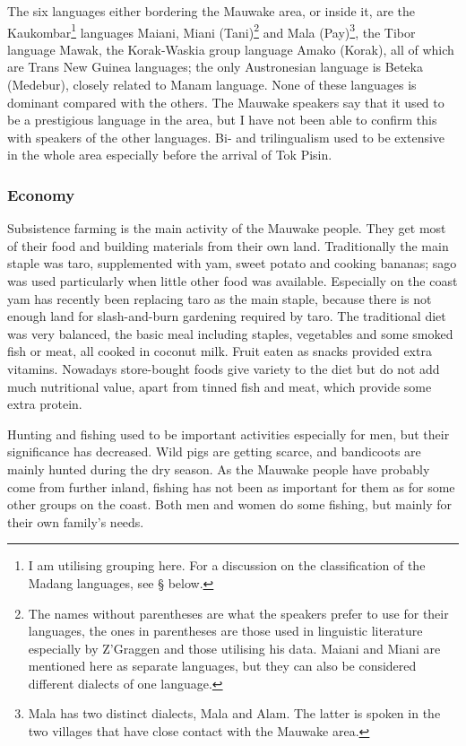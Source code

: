 The six languages either bordering the Mauwake area, or inside it, are the Kaukombar\footnote{I am utilising  grouping here. For a discussion on the classification of the Madang languages, see {\S} below.} languages Maiani, Miani (Tani)\footnote{The names without parentheses are what the speakers prefer to use for their languages, the ones in parentheses are those used in linguistic literature especially by Z'Graggen and those utilising his data. Maiani and Miani are mentioned here as separate languages, but they can also be considered different dialects of one language.}  and Mala (Pay)\footnote{Mala has two distinct dialects, Mala and Alam. The latter is spoken in the two villages that have close contact with the Mauwake area.}, the Tibor language Mawak, the Korak-Waskia group language Amako (Korak), all of which are Trans New Guinea languages; the only Austronesian language is Beteka (Medebur), closely related to Manam language. None of these languages is dominant compared with the others.  The Mauwake speakers say that it used to be a prestigious language in the area, but I have not been able to confirm this with speakers of the other languages. Bi- and trilingualism used to be extensive in the whole area especially before the arrival of Tok Pisin. 


\subsubsection{Economy}
Subsistence farming is the main activity of the Mauwake people. They get most of their food and building materials from their own land.  Traditionally the main staple was taro, supplemented with yam, sweet potato and cooking bananas; sago was used particularly when little other food was available. Especially on the coast yam has recently been replacing taro as the main staple, because there is not enough land for slash-and-burn gardening required by taro. The traditional diet was very balanced, the basic meal including staples, vegetables and some smoked fish or meat, all cooked in coconut milk. Fruit eaten as snacks provided extra vitamins. Nowadays store-bought foods give variety to the diet but do not add much nutritional value, apart from tinned fish and meat, which provide some extra protein.

Hunting and fishing used to be important activities especially for men, but their significance has decreased. Wild pigs are getting scarce, and bandicoots are mainly hunted during the dry season.  As the Mauwake people have probably come from further inland, fishing has not been as important for them as for some other groups on the coast.  Both men and women do some fishing, but mainly for their own family's needs. 

